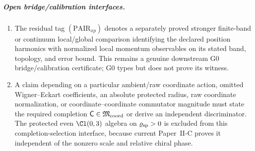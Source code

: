 \documentclass[12pt,a4paper]{article}
\begin{document}
\begin{definition}
\subparagraph{Open bridge/calibration interfaces.}
\begin{enumerate}[label=(\roman*),leftmargin=2em,resume]
\item The residual tag \((\mathrm{PAIR}_{xp})\) denotes a separately proved
stronger finite-band or continuum local/global comparison identifying the
declared position harmonics with normalized local momentum observables on its
stated band, topology, and error bound.  This remains a genuine downstream G0
bridge/calibration certificate; G0 types but does not prove its witness.
\item A claim depending on a particular ambient/raw coordinate action, omitted
Wigner--Eckart coefficients, an absolute protected radius, raw coordinate
normalization, or coordinate--coordinate commutator magnitude must state the
required completion \(\mathsf C\in\mathfrak M_{\rm coord}\) or derive an
independent discriminator.  The protected even \(\Cl(0,3)\) algebra on
\(\varrho_{\rm sp}>0\) is excluded from this completion-selection interface,
because current Paper~II-C proves it independent of the nonzero scale and
relative chiral phase.
\end{enumerate}


\end{definition}
\end{document}
